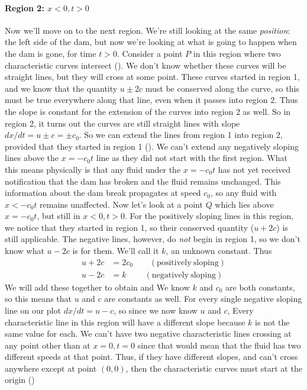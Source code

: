 \documentclass[12pt]{book}
\begin{document}
\paragraph{Region 2: $x<0\comma t>0$} Now we'll move on to the next region.  We're still looking at the same \textit{position}: the left side of the dam, but now we're looking at what is going to happen when the dam is gone, for time $t>0$.  Consider a point $P$ in this region where two characteristic curves intersect ().   We don't know whether these curves will be straight lines, but they will cross at some point.  These curves started in region 1, and we know that the quantity $u \pm 2c$ must be conserved along the curve, so this must be true everywhere along that line, even when it passes into region 2.  Thus the slope is constant for the extension of the curves into region 2 as well.  So in region 2, it turns out the curves are still straight lines with slope $dx/dt=u\pm c = \pm c_0$. So we can extend the lines from region 1 into region 2, provided that they started in region 1 ().  We can't extend any negatively sloping lines above the $x=-c_0t$ line as they did not start with the first region.  What this means physically is that any fluid under the $x=-c_0t$ has not yet received notification that the dam has broken and the fluid remains unchanged. This information about the dam break propagates at speed $c_0$, so any fluid with $x<-c_0 t$ remains unaffected.  
 Now let's look at a point $Q$ which lies above $x=-c_0 t$, but still in $x<0\comma t>0$.  For the positively sloping lines in this region, we notice that they started in region 1, so their conserved quantity ($u+2c$) is still applicable.  The negative lines, however, do \textit{not} begin in region 1, so we don't know what $u-2c$ is for them.  We'll call it $k$, an unknown constant.  Thus
\begin{align*}
u+2c &= 2c_0 \qquad \mathrm{(positively\ sloping)} \\
u-2c &= k\ \qquad \mathrm{(negatively\  sloping) }
\end{align*}
We will add these together to obtain
 and 
We know $k$ and $c_0$ are both constants, so this means that $u$ and $c$ are constants as well.   For every single negative sloping line on our plot  $dx/dt=u-c$, so since we now know $u$ and $c$,
Every characteristic line in this region will have a different slope because $k$ is not the same value for each.  We can't have two negative characteristic lines crossing at any point other than at $x=0\comma t=0$ since that would mean that the fluid has two different speeds at that point. Thus, if they have different slopes, and can't cross anywhere except at point $(0,0)$, then the characteristic curves must start at the origin ()
\end{document}
